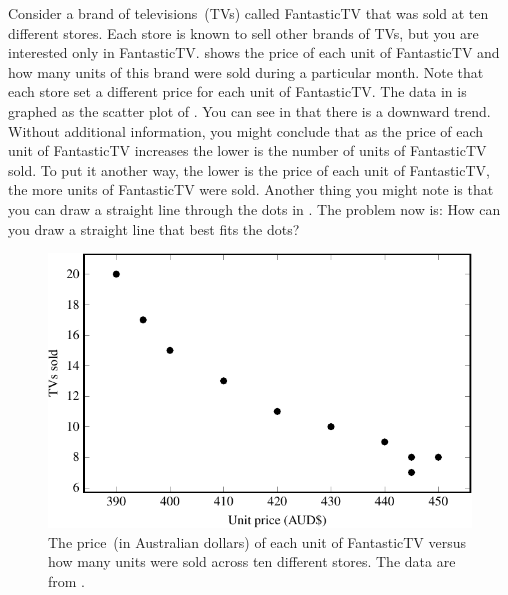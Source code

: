 \documentclass[a4paper,oneside,12pt]{article}
\begin{document}
Consider a brand of televisions~(TVs) called FantasticTV that was sold
at ten different stores.  Each store is known to sell other brands of
TVs, but you are interested only in FantasticTV.  
shows the price of each unit of FantasticTV and how many units of this
brand were sold during a particular month.  Note that each store set a
different price for each unit of FantasticTV.  The data in
 is graphed as the scatter plot of
.  You can see in  that there
is a downward trend.  Without additional information, you might
conclude that as the price of each unit of FantasticTV increases the
lower is the number of units of FantasticTV sold.  To put it another
way, the lower is the price of each unit of FantasticTV, the more
units of FantasticTV were sold.  Another thing you might note is that
you can draw a straight line through the dots in .
The problem now is: How can you draw a straight line that best fits
the dots?

\begin{table}[!htbp]
\centering

\caption{%
  The price of each unit of FantasticTV versus the number of units
  sold.  The price is measured in Australian dollars.  The number of
  units sold is during a particular month.  Units of FantasticTV were
  sold across ten different stores, but each store set a different
  price.
}
\label{tab:tv_sold}
\end{table}

\begin{figure}[!htbp]
\centering
\includegraphics[scale=1.1]{image/07/fantastic-tv-scatterplot.pdf}
\caption{%
  The price~(in Australian dollars) of each unit of FantasticTV versus
  how many units were sold across ten different stores.  The data are
  from .
}
\label{fig:tv_sold}
\end{figure}
\end{document}
